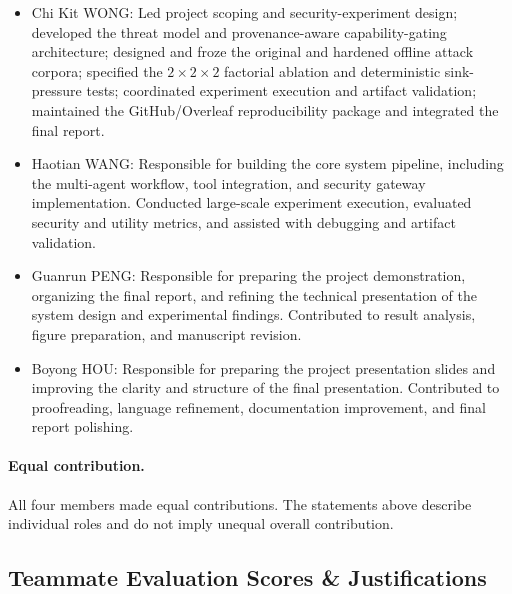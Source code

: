 \documentclass[journal]{IEEEtran}
\begin{document}
\begin{itemize}[nosep]
  \item Chi Kit WONG: Led project scoping and security-experiment design; developed the threat model and provenance-aware capability-gating architecture; designed and froze the original and hardened offline attack corpora; specified the $2 \times 2 \times 2$ factorial ablation and deterministic sink-pressure tests; coordinated experiment execution and artifact validation; maintained the GitHub/Overleaf reproducibility package and integrated the final report.
  \item Haotian WANG: Responsible for building the core system pipeline,
including the multi-agent workflow, tool integration, and security
gateway implementation. Conducted large-scale experiment execution,
evaluated security and utility metrics, and assisted with debugging and
artifact validation.
  \item Guanrun PENG: Responsible for preparing the project demonstration,
organizing the final report, and refining the technical presentation of
the system design and experimental findings. Contributed to result
analysis, figure preparation, and manuscript revision.
  \item Boyong HOU: Responsible for preparing the project presentation slides
and improving the clarity and structure of the final presentation.
Contributed to proofreading, language refinement, documentation
improvement, and final report polishing.
\end{itemize}

\paragraph{Equal contribution.}
All four members made equal contributions. The statements above describe
individual roles and do not imply unequal overall contribution.
\subsection{Teammate Evaluation Scores \& Justifications}
\end{document}
